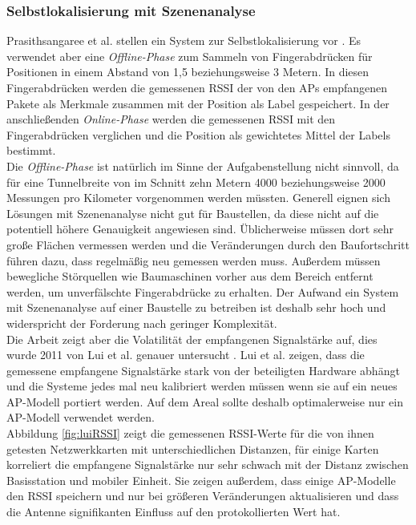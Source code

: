 \subsubsection{Selbstlokalisierung mit Szenenanalyse}
\label{ch:Vorherige:sec:RSS-basierte}
Prasithsangaree et al. stellen ein System zur Selbstlokalisierung vor \cite{prasithsangaree2002indoor}. 
Es verwendet aber eine \emph{Offline-Phase} zum Sammeln von Fingerabdrücken für Positionen in einem Abstand von 1,5 beziehungsweise 3 Metern. 
In diesen Fingerabdrücken werden die gemessenen RSSI der von den APs empfangenen Pakete als Merkmale zusammen mit der Position als Label gespeichert.
In der anschließenden \emph{Online-Phase} werden die gemessenen RSSI mit den Fingerabdrücken verglichen und die Position als gewichtetes Mittel der Labels bestimmt. \\
Die \emph{Offline-Phase} ist natürlich im Sinne der Aufgabenstellung nicht sinnvoll, da für eine Tunnelbreite von im Schnitt zehn Metern 4000 beziehungsweise 2000 Messungen pro Kilometer vorgenommen werden müssten.
Generell eignen sich Lösungen mit Szenenanalyse nicht gut für Baustellen, da diese nicht auf die potentiell höhere Genauigkeit angewiesen sind. 
Üblicherweise müssen dort sehr große Flächen vermessen werden und die Veränderungen durch den Baufortschritt führen dazu, dass regelmäßig neu gemessen werden muss.
Außerdem müssen bewegliche Störquellen wie Baumaschinen vorher aus dem Bereich entfernt werden, um unverfälschte Fingerabdrücke zu erhalten.
Der Aufwand ein System mit Szenenanalyse auf einer Baustelle zu betreiben ist deshalb sehr hoch und widerspricht der Forderung nach geringer Komplexität. \\
Die Arbeit zeigt aber die Volatilität der empfangenen Signalstärke auf, dies wurde 2011 von Lui et al. genauer untersucht \cite{lui2011differences}.
Lui et al. zeigen, dass die gemessene empfangene Signalstärke stark von der beteiligten Hardware abhängt und die Systeme jedes mal neu kalibriert werden müssen wenn sie auf ein neues AP-Modell portiert werden. 
Auf dem Areal sollte deshalb optimalerweise nur ein AP-Modell verwendet werden. \\
Abbildung \ref{fig:luiRSSI} zeigt die gemessenen RSSI-Werte für die von ihnen getesten Netzwerkkarten mit unterschiedlichen Distanzen, für einige Karten korreliert die empfangene Signalstärke nur sehr schwach mit der Distanz zwischen Basisstation und mobiler Einheit.
Sie zeigen außerdem, dass einige AP-Modelle den RSSI speichern und nur bei größeren Veränderungen aktualisieren und dass die Antenne signifikanten Einfluss auf den protokollierten Wert hat.

